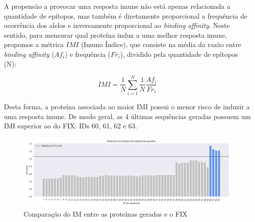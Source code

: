 \begin{figure}%
    \centering
    \qquad
\end{figure}

A propensão a provocar uma resposta imune não está apenas relacionada a quantidade de epítopos, 
mas também é diretamente proporcional a frequência de ocorrência dos alelos e inversamente proporcional 
ao \textit{binding affinity}. Neste sentido, para mensurar qual proteína induz a uma melhor resposta imune, propomos a 
métrica $IMI$ (Imuno Índice), que consiste na média da razão entre \textit{binding affinity} (${Af}_{i}$) 
e frequência ($Fr_{i}$), 
dividido pela quantidade de epítopos (N):

\begin{equation}
    IMI = \frac{1}{N} \sum_{i=1}^{N} \frac{1}{N} \frac{{Af}_{i}}{Fr_{i}}
\end{equation}

Desta forma, a proteína associada ao maior IMI possui o menor risco de induzir a uma resposta imune.
De modo geral, as 4 últimas sequências geradas possuem um IMI superior ao do FIX: IDs 60, 61, 62 e 63.

\begin{figure}[H]
    \centering
    \includegraphics[width=.9\linewidth]{figuras/plot_imuno_IMscore_geral.png}    
    \caption{Comparação do IM entre as proteínas geradas e o FIX}
    \label{fig:immuno_tscore}
\end{figure}


